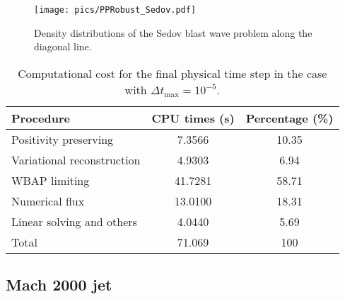 \begin{figure}[htbp]
    \centering
    \texttt{[image: pics/PPRobust\_Sedov.pdf]}
    \caption{Density distributions of the Sedov blast wave problem along the diagonal line.}
    \label{fig:sedovLine}
\end{figure}

\begin{table}[htbp!]
    \centering
    \caption{Computational cost for the final physical time step in the case with $\Delta t_{\text{max}} = 10^{-5}$.}
    \label{tab:cpu-time-cost}
    \setlength{\tabcolsep}{12.5pt} %
    \renewcommand{\arraystretch}{1.2}
    \begin{tabular}{l c c}
        \toprule
        Procedure & CPU times (s) & Percentage (\%) \\
        \midrule
        Positivity preserving & 7.3566 & 10.35\\
        Variational reconstruction & 4.9303 & 6.94\\
        WBAP limiting & 41.7281 & 58.71\\
        Numerical flux & 13.0100 & 18.31\\
        Linear solving and others &  4.0440 & 5.69\\
        \midrule
        {Total} & 71.069 & 100 \\
    \bottomrule
    \end{tabular}
\end{table}

\subsection{Mach 2000 jet}

